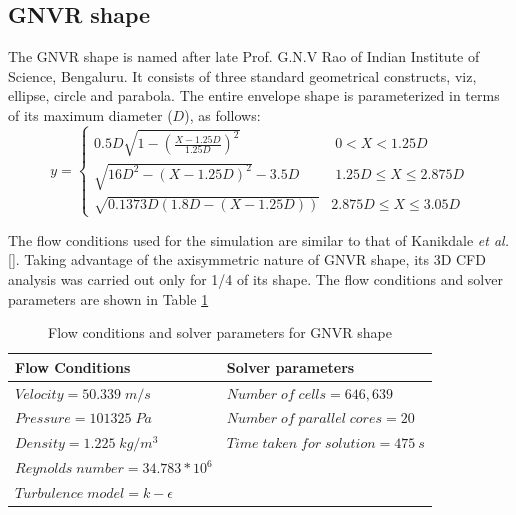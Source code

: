 \subsection{GNVR shape}
The GNVR shape  is named after late Prof. G.N.V Rao of Indian Institute of Science, Bengaluru. It consists of three standard geometrical constructs, viz, ellipse, circle and parabola. The entire envelope shape is parameterized in terms of its maximum diameter ($D$), as follows:
\begin{equation}
y = \begin{cases}
0.5D \sqrt{1-(\frac{X-1.25D}{1.25D})^2} & \; 0 < X < 1.25D  \\
\sqrt{16D^2 - (X-1.25D)^2 } - 3.5 D & \; 1.25D \le X \le 2.875D \\
\sqrt{0.1373D(1.8D - (X-1.25D))} &  2.875D \le X \le 3.05D 
\end{cases}
\label{GNVR eqn}
\end{equation}


The flow conditions used for the simulation are similar to that of Kanikdale \textit{et al.} []. Taking advantage of the axisymmetric nature of GNVR shape, its 3D CFD analysis was carried out only for 1/4 of its shape. The flow conditions and solver parameters are shown in Table \ref{Flow conditions and solver parametres for GNVR shape}

\begin{table}[H]
	\caption{Flow conditions and solver parameters for GNVR shape}
	\label{Flow conditions and solver parametres for GNVR shape}
	\centering
	\begin{tabular}{ll}
		\hline \hline
		Flow Conditions & Solver parameters  \\ \hline \hline
		
		$ Velocity = 50.339 \; m/s$ & $Number \; of \; cells = 646,639$    \\  
		$ Pressure = 101325 \; Pa $ & $ Number \; of \; parallel \; cores = 20 $     \\
		$ Density = 1.225 \; kg/m^{3} $ & $ Time \; taken \; for \; solution = 475~s  $    \\
		$ Reynolds \; number = 34.783 * 10^{6} $ &    \\
		$ Turbulence \; model = k - \epsilon $ &     \\
		\hline
	\end{tabular}
\end{table}





